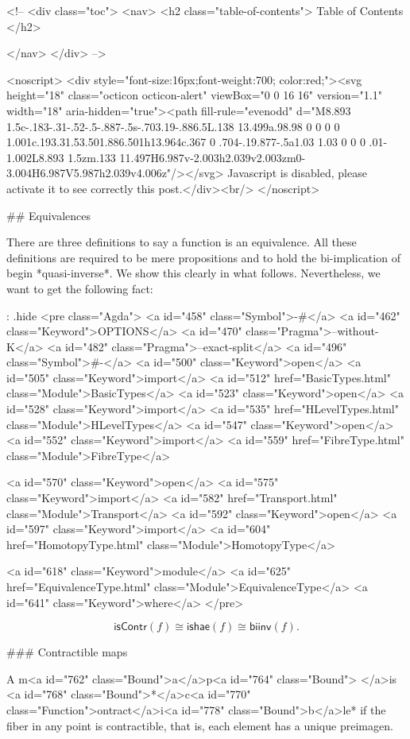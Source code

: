   <!-- 
  <div class="toc">
    <nav>
    <h2 class="table-of-contents"> Table of Contents </h2>
      

    </nav>
  </div>
   -->

  <noscript>
  <div style="font-size:16px;font-weight:700; color:red;"><svg height="18" class="octicon octicon-alert" viewBox="0 0 16 16" version="1.1" width="18" aria-hidden="true"><path fill-rule="evenodd" d="M8.893 1.5c-.183-.31-.52-.5-.887-.5s-.703.19-.886.5L.138 13.499a.98.98 0 0 0 0 1.001c.193.31.53.501.886.501h13.964c.367 0 .704-.19.877-.5a1.03 1.03 0 0 0 .01-1.002L8.893 1.5zm.133 11.497H6.987v-2.003h2.039v2.003zm0-3.004H6.987V5.987h2.039v4.006z"/></svg> Javascript is disabled, please activate it to see correctly this post.</div><br/>
  </noscript>

  ## Equivalences

There are three definitions to say a function is an equivalence. All these
definitions are required to be mere propositions and to hold the
bi-implication of begin *quasi-inverse*. We show this clearly in what follows.
Nevertheless, we want to get the following fact:


{: .hide}
<pre class="Agda">
<a id="458" class="Symbol">{-#</a> <a id="462" class="Keyword">OPTIONS</a> <a id="470" class="Pragma">--without-K</a> <a id="482" class="Pragma">--exact-split</a> <a id="496" class="Symbol">#-}</a>
<a id="500" class="Keyword">open</a> <a id="505" class="Keyword">import</a> <a id="512" href="BasicTypes.html" class="Module">BasicTypes</a>
<a id="523" class="Keyword">open</a> <a id="528" class="Keyword">import</a> <a id="535" href="HLevelTypes.html" class="Module">HLevelTypes</a>
<a id="547" class="Keyword">open</a> <a id="552" class="Keyword">import</a> <a id="559" href="FibreType.html" class="Module">FibreType</a>

<a id="570" class="Keyword">open</a> <a id="575" class="Keyword">import</a> <a id="582" href="Transport.html" class="Module">Transport</a>
<a id="592" class="Keyword">open</a> <a id="597" class="Keyword">import</a> <a id="604" href="HomotopyType.html" class="Module">HomotopyType</a>

<a id="618" class="Keyword">module</a> <a id="625" href="EquivalenceType.html" class="Module">EquivalenceType</a> <a id="641" class="Keyword">where</a>
</pre>

$$ \mathsf{isContr}(f) \cong \mathsf{ishae}(f) \cong \mathsf{biinv}(f). $$


### Contractible maps

A m<a id="762" class="Bound">a</a>p<a id="764" class="Bound"> </a>is <a id="768" class="Bound">*</a>c<a id="770" class="Function">ontract</a>i<a id="778" class="Bound">b</a>le* if the fiber in any point is contractible, that is, each
element has a unique preimagen.

